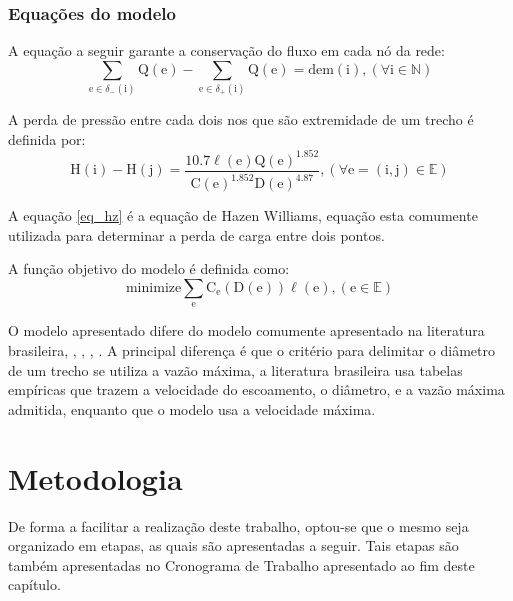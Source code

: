 \documentclass[
	12pt,				%
	openright,			%
	twoside,			%
	a4paper,			%
	english,			%
	french,				%
	spanish,			%
	brazil				%
	]{abntex2}
\newcommand{\setN}{\mathbb{N}}
\newcommand{\setE}{\mathbb{E}}
\newcommand{\setdp}{\delta_{+}}
\newcommand{\setdn}{\delta_{-}}
\newcommand{\edge}{\mathrm{e}}
\newcommand{\inode}{\mathrm{i}}
\newcommand{\jnode}{\mathrm{j}}
\newcommand{\dem}{\mathrm{dem}}
\newcommand{\C}{\mathrm{C}}
\newcommand{\vQ}{\mathrm{Q}}
\newcommand{\vH}{\mathrm{H}}
\newcommand{\vD}{\mathrm{D}}
\begin{document}
\subsection{Equações do modelo}

A equação a seguir garante a conservação do fluxo em cada nó da rede:
\begin{equation}\label{eq_fluxo}
\sum_{\edge \in \setdn\!\left( \inode \right)} \!\!\!\vQ \! \left( \edge \right) - \sum_{\edge \in 	\setdp\!\left( \inode \right)} \!\!\! \vQ \!\left( \edge \right) =  \dem\!\left( \inode \right), \left(\forall \inode \in \setN \right)
\end{equation}


A perda de pressão entre cada dois nos que são extremidade de um trecho é definida por:
\begin{equation}\label{eq_hz}
\vH\!\left( \inode \right) - \vH\!\left( \jnode \right) = \dfrac{10.7 \ell \!\left( \edge \right)\vQ\!\left( \edge \right)^{1.852}}{\C\!\left( \edge \right)^{1.852}\vD\!\left( \edge \right)^{4.87}}, \left(\forall \edge = (\inode, \jnode) \in \setE \right)
\end{equation}

A equação \ref{eq_hz} é a equação de Hazen Williams, equação esta comumente utilizada para determinar a perda de carga entre dois pontos.

A função objetivo do modelo é definida como:
\begin{equation}\label{eq_objetivo}
	\mathrm{minimize} \sum_{\edge}  \mathrm{C_{e}}\!\left(\vD\!\left( \edge \right)\right)\ell\!\left( \edge \right), \left(\edge \in \setE \right)
\end{equation}

O modelo apresentado difere do modelo comumente apresentado na literatura brasileira, , , , . 
A principal diferença é que o critério para delimitar o diâmetro de um trecho se utiliza a vazão máxima, a literatura brasileira usa tabelas empíricas que trazem a velocidade do escoamento, o diâmetro, e a vazão máxima admitida, enquanto que o modelo usa a velocidade máxima.


\chapter{Metodologia}
 
	De forma a facilitar a realização deste trabalho, optou-se que o mesmo seja organizado em etapas, as quais são apresentadas a seguir. Tais etapas são também apresentadas no Cronograma de Trabalho apresentado ao fim deste capítulo. 
\end{document}
